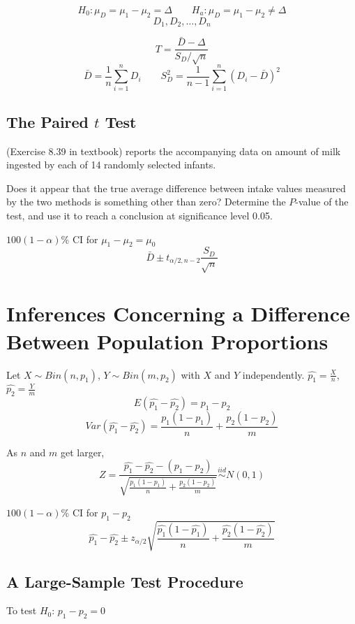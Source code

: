 \[H_0:\mu_D=\mu_1-\mu_2=\Delta \qquad H_a:\mu_D=\mu_1-\mu_2 \neq\Delta\]
\[D_1,D_2,\dots,D_n\]

\[T=\frac{\bar{D}-\Delta}{S_D/\sqrt{n}}\]
\[\bar{D}=\frac{1}{n}\sum_{i=1}^n D_i \qquad  S_D^2=\frac{1}{n-1}\sum_{i=1}^n (D_i-\bar{D})^2\]

\subsection{The Paired $t$ Test}

\begin{exmp}
(Exercise 8.39 in textbook) reports the accompanying data on amount of milk ingested by each of 14 randomly selected infants.

Does it appear that the true average difference between intake values measured by the two methods is something other than zero? Determine the $P$-value of the test, and use it to reach a conclusion at significance level 0.05.

\end{exmp}

$100(1-\alpha)$\% CI for $\mu_1-\mu_2=\mu_0$
\[\bar{D} \pm t_{\alpha/2,n-2}\frac{S_D}{\sqrt{n}}\]

\section{Inferences Concerning a Difference Between Population Proportions}

\begin{prop}
Let $X\sim Bin(n,p_1)$, $Y\sim Bin(m,p_2)$ with $X$ and $Y$ independently. $\hat{p_1}=\frac{X}{n}$,$\hat{p_2}=\frac{Y}{m}$
\[E(\hat{p_1}-\hat{p_2})=p_1-p_2\]
\[Var(\hat{p_1}-\hat{p_2})=\frac{p_1(1-p_1)}{n}+\frac{p_2(1-p_2)}{m}\]
\end{prop}

As $n$ and $m$ get larger,
\[Z=\frac{\hat{p_1}-\hat{p_2}-(p_1-p_2)}{\sqrt{\frac{p_1(1-p_1)}{n}+\frac{p_2(1-p_2)}{m}}} \overset{iid}{\sim} N(0,1)\]

$100(1-\alpha)$\% CI for $p_1-p_2$
\[\hat{p_1}-\hat{p_2} \pm z_{\alpha/2}\sqrt{\frac{\hat{p_1}(1-\hat{p_1})}{n}+\frac{\hat{p_2}(1-\hat{p_2})}{m}}\]

\subsection{A Large-Sample Test Procedure}

To test $H_0$: $p_1-p_2=0$

